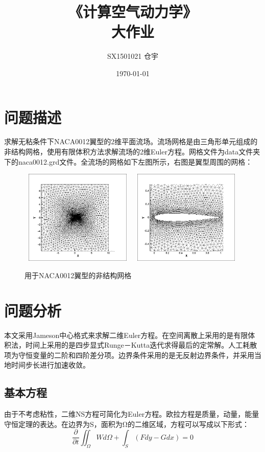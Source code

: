 \documentclass[UTF8]{ctexart}
\title{\heiti 《计算空气动力学》 \\ 大作业}
\author{SX1501021 仓宇}
\date{\today}
\begin{document}
\maketitle
\setcounter{page}{0}
\thispagestyle{empty}
\clearpage

\tableofcontents
\clearpage

\section{问题描述}
求解无粘条件下NACA0012翼型的2维平面流场。流场网格是由三角形单元组成的非结构网格，使用有限体积方法求解流场的2维Euler方程。网格文件为data文件夹下的naca0012.grd文件。全流场的网格如下左图所示，右图是翼型周围的网格：
\begin{figure}[htbp]\centering
\includegraphics[width=5.5cm,height=4.5cm]{../data/mesh_naca0012.png}
\includegraphics[width=5.5cm,height=4.5cm]{../data/mesh_naca0012_local.png}
\caption{用于NACA0012翼型的非结构网格}
\end{figure}

\section{问题分析}
本文采用Jameson中心格式来求解二维Euler方程。在空间离散上采用的是有限体积法，时间上采用的是四步显式Runge－Kutta迭代求得最后的定常解。人工耗散项为守恒变量的二阶和四阶差分项。边界条件采用的是无反射边界条件，并采用当地时间步长进行加速收敛。

\subsection{基本方程}
由于不考虑粘性，二维NS方程可简化为Euler方程。欧拉方程是质量，动量，能量守恒定理的表达。在边界为S，面积为Ω的二维区域，方程可以写成以下形式：
\begin{equation}\label{euler}
\frac{\partial}{\partial t} \iint_{\Omega} W d\Omega + \int_{S} (Fdy-Gdx) = 0
\end{equation}
\end{document}

